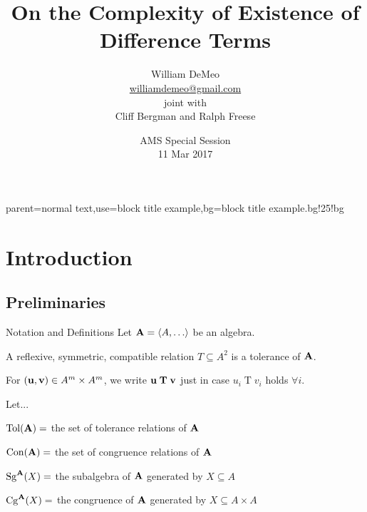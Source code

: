\documentclass[notes=hide,12pt,xcolor=dvipsnames%
   ]{beamer}
\renewcommand{\defn}[1]{\alert{#1}}
\begin{document}
\title[Existence of Difference Terms]{On the Complexity of Existence of \\Difference Terms}
\author[\url{williamdemeo@gmail.com}]
       {William DeMeo\\
{\small \url{williamdemeo@gmail.com}}
\\[5pt]{\small joint with}\\
{\small   Cliff Bergman and Ralph Freese}}

\date[11 Mar 2017]{AMS Special Session\\[10pt]
11 Mar 2017}

\frame[label=title]{\titlepage}

%
{parent=normal text,use=block title example,bg=block title example.bg!25!bg}

\section{Introduction}
\newcommand\oftype{\ensuremath{\mathrel{:}}}
\subsection{Preliminaries}
\begin{frame}[shrink=10,label=defs]{Notation and Definitions}
  Let $\bA = \<A, \dots\>$ be an algebra.
  
  A reflexive, symmetric, compatible relation $T\subseteq A^2$ is a
  \defn{tolerance} of $\mathbf{A}$.  

  For $(\mathbf{u}, \mathbf{v}) \in A^m\times A^m$, we write
  $\mathbf{u} \mathrel{\mathbf{T}} \mathbf{v}$ just in case $u_i \mathrel{T} v_i$ holds $\forall i$.

  \pause 
  Let...
  
  $\operatorname{Tol}(\mathbf{A}) = $ the set of tolerance relations of $\mathbf{A}$
  
  $\operatorname{Con}(\mathbf{A}) = $ the set of congruence relations of $\mathbf{A}$

  $\operatorname{Sg}^{\mathbf{A}}(X) = $ the subalgebra of $\mathbf{A}$ generated by $X \subseteq A$

  $\operatorname{Cg}^{\mathbf{A}}(X) = $ the congruence of $\mathbf{A}$ generated by $X \subseteq A\times A$
\end{frame}
\end{document}
